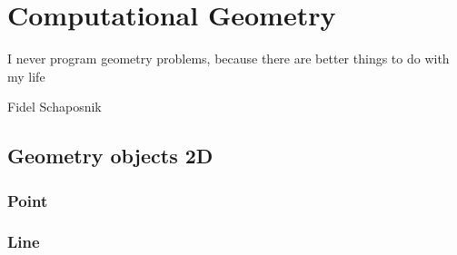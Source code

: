 \chapter{Computational Geometry}
  \epigraph{I never program geometry problems, because there are better things to do with my life}{Fidel Schaposnik}
	\section{Geometry objects 2D}
		\subsection{Point}
			
		\subsection{Line}
			
